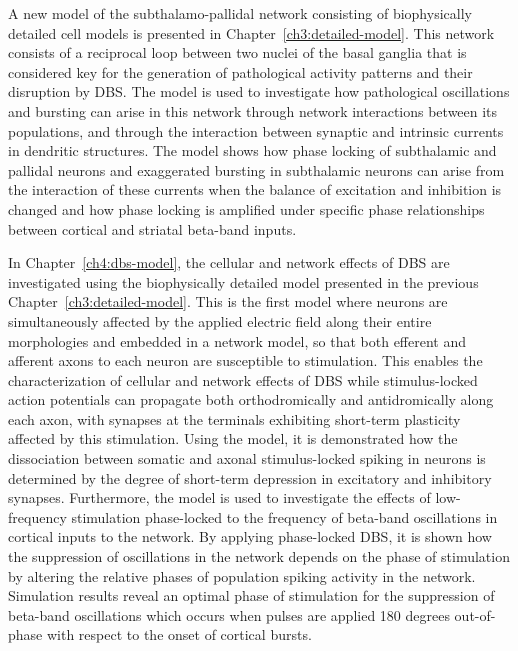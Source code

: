 %
A new model of the subthalamo-pallidal network consisting of biophysically
detailed cell models is presented in Chapter~\ref{ch3:detailed-model}.
This network consists of a reciprocal loop between two nuclei of the
basal ganglia that is considered key for the generation of pathological
activity patterns and their disruption by DBS. The model is used to
investigate how pathological oscillations and bursting can arise in this
network through network interactions between its populations, and through
the interaction between synaptic and intrinsic currents in dendritic structures.
The model shows how phase locking of subthalamic and pallidal neurons and
exaggerated bursting in subthalamic neurons can arise from the interaction
of these currents when the balance of excitation and inhibition is changed
and how phase locking is amplified under specific phase relationships between
cortical and striatal beta-band inputs.
%
%

%
%
%
%
%
%
%
%
%
In Chapter~\ref{ch4:dbs-model}, the cellular and network effects of DBS
are investigated using the biophysically detailed model presented in the
previous Chapter~\ref{ch3:detailed-model}. This is the first model where
neurons are simultaneously
affected by the applied electric field along their entire morphologies
and embedded in a network model, so that both efferent and afferent axons
to each neuron are susceptible to stimulation. This enables the characterization
of cellular and network effects of DBS while stimulus-locked action potentials can
propagate both orthodromically and antidromically along each axon, with synapses
at the terminals exhibiting short-term plasticity affected by this stimulation.
%
Using the model, it is demonstrated how the dissociation between
somatic and axonal stimulus-locked spiking in neurons is determined
by the degree of short-term depression in excitatory and inhibitory synapses.
%
Furthermore, the model is used to investigate the effects of low-frequency
stimulation phase-locked to the frequency of beta-band oscillations in
cortical inputs to the network. By applying phase-locked DBS, it is shown
how the suppression of oscillations in the network depends on the phase
of stimulation by altering the relative phases of population spiking activity
in the network. Simulation results reveal an optimal phase of stimulation
for the suppression of beta-band oscillations which occurs when pulses
are applied 180 degrees out-of-phase with respect to the onset of cortical bursts.

